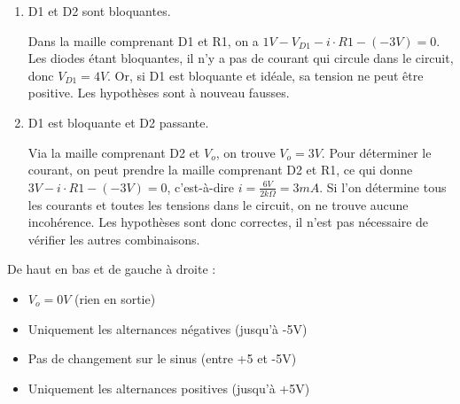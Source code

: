 \documentclass{../template/tp}
\begin{document}
{\begin{enumerate}
    \item D1 et D2 sont bloquantes.

    Dans la maille comprenant D1 et R1, on a $1V - V_{D1} - i \cdot R1 - (-3V) = 0$.
    Les diodes étant bloquantes, il n'y a pas de courant qui circule dans le circuit, donc $V_{D1} = 4V$.
    Or, si D1 est bloquante et idéale, sa tension ne peut être positive.
    Les hypothèses sont à nouveau fausses.

    \item D1 est bloquante et D2 passante.

    Via la maille comprenant D2 et $V_o$, on trouve $V_o = 3V$.
    Pour déterminer le courant, on peut prendre la maille comprenant D2 et R1, ce qui donne $3V - i \cdot R1 - (-3V) = 0$, c'est-à-dire $i = \frac{6V}{2k\Omega} = 3mA$.
    Si l'on détermine tous les courants et toutes les tensions dans le circuit, on ne trouve aucune incohérence.
    Les hypothèses sont donc correctes, il n'est pas nécessaire de vérifier les autres combinaisons.
\end{enumerate}
}


{%
De haut en bas et de gauche à droite :
    \begin{itemize}
        \item $V_o = 0V$ (rien en sortie)
        \item Uniquement les alternances négatives (jusqu'à -5V)
        \item Pas de changement sur le sinus (entre +5 et -5V)
        \item Uniquement les alternances positives (jusqu'à +5V)
    \end{itemize}
}
\end{document}
